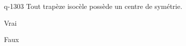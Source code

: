 \begin{truefalse}{q-1303}
Tout trapèze isocèle possède un centre de symétrie.
\item Vrai
\item* Faux
\end{truefalse}

